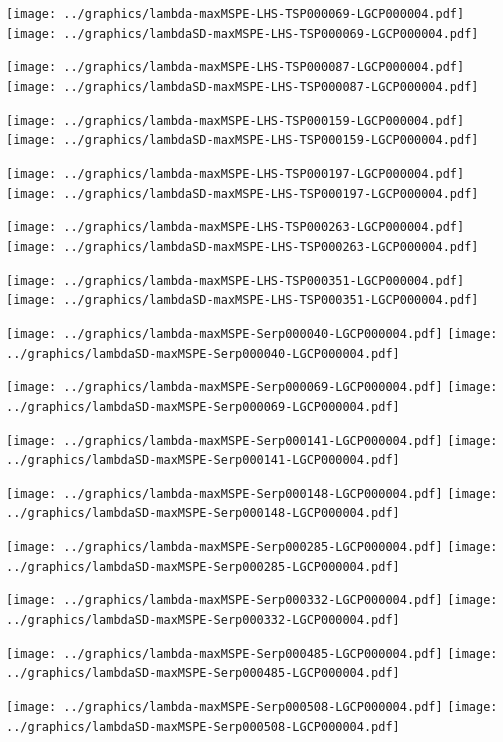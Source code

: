 \documentclass[review]{elsarticle}
\begin{document}
\texttt{[image: ../graphics/lambda-maxMSPE-LHS-TSP000069-LGCP000004.pdf]}
\texttt{[image: ../graphics/lambdaSD-maxMSPE-LHS-TSP000069-LGCP000004.pdf]}

\texttt{[image: ../graphics/lambda-maxMSPE-LHS-TSP000087-LGCP000004.pdf]}
\texttt{[image: ../graphics/lambdaSD-maxMSPE-LHS-TSP000087-LGCP000004.pdf]}

\texttt{[image: ../graphics/lambda-maxMSPE-LHS-TSP000159-LGCP000004.pdf]}
\texttt{[image: ../graphics/lambdaSD-maxMSPE-LHS-TSP000159-LGCP000004.pdf]}

\texttt{[image: ../graphics/lambda-maxMSPE-LHS-TSP000197-LGCP000004.pdf]}
\texttt{[image: ../graphics/lambdaSD-maxMSPE-LHS-TSP000197-LGCP000004.pdf]}

\texttt{[image: ../graphics/lambda-maxMSPE-LHS-TSP000263-LGCP000004.pdf]}
\texttt{[image: ../graphics/lambdaSD-maxMSPE-LHS-TSP000263-LGCP000004.pdf]}

\texttt{[image: ../graphics/lambda-maxMSPE-LHS-TSP000351-LGCP000004.pdf]}
\texttt{[image: ../graphics/lambdaSD-maxMSPE-LHS-TSP000351-LGCP000004.pdf]}

\texttt{[image: ../graphics/lambda-maxMSPE-Serp000040-LGCP000004.pdf]}
\texttt{[image: ../graphics/lambdaSD-maxMSPE-Serp000040-LGCP000004.pdf]}

\texttt{[image: ../graphics/lambda-maxMSPE-Serp000069-LGCP000004.pdf]}
\texttt{[image: ../graphics/lambdaSD-maxMSPE-Serp000069-LGCP000004.pdf]}

\texttt{[image: ../graphics/lambda-maxMSPE-Serp000141-LGCP000004.pdf]}
\texttt{[image: ../graphics/lambdaSD-maxMSPE-Serp000141-LGCP000004.pdf]}

\texttt{[image: ../graphics/lambda-maxMSPE-Serp000148-LGCP000004.pdf]}
\texttt{[image: ../graphics/lambdaSD-maxMSPE-Serp000148-LGCP000004.pdf]}

\texttt{[image: ../graphics/lambda-maxMSPE-Serp000285-LGCP000004.pdf]}
\texttt{[image: ../graphics/lambdaSD-maxMSPE-Serp000285-LGCP000004.pdf]}

\texttt{[image: ../graphics/lambda-maxMSPE-Serp000332-LGCP000004.pdf]}
\texttt{[image: ../graphics/lambdaSD-maxMSPE-Serp000332-LGCP000004.pdf]}

\texttt{[image: ../graphics/lambda-maxMSPE-Serp000485-LGCP000004.pdf]}
\texttt{[image: ../graphics/lambdaSD-maxMSPE-Serp000485-LGCP000004.pdf]}

\texttt{[image: ../graphics/lambda-maxMSPE-Serp000508-LGCP000004.pdf]}
\texttt{[image: ../graphics/lambdaSD-maxMSPE-Serp000508-LGCP000004.pdf]}
\end{document}
